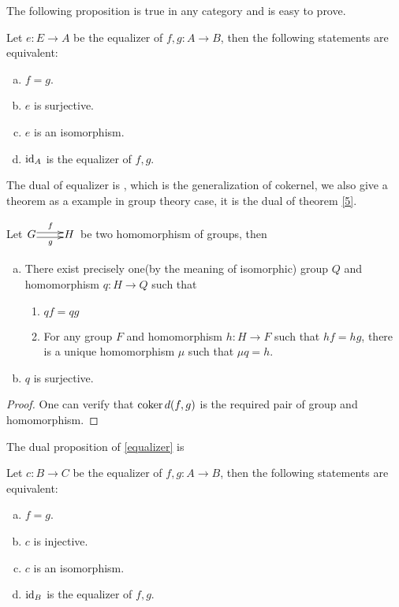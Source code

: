 The following proposition is true in any category and is easy to prove.
\begin{prop}\label{equalizer}
  Let $e\colon E\to A$ be the equalizer of $f,g\colon A\to B$, then the following statements are equivalent:
  \begin{enumerate}[a)]
    \setlength{\itemindent}{2ex}
    \item $f=g$.
    \item $e$ is surjective.
    \item $e$ is an isomorphism.
    \item $\operatorname{id}_A$ is the equalizer of $f,g$.
  \end{enumerate}
\end{prop}
The dual of equalizer is , which is the generalization of cokernel, we also give a theorem as a example in group theory case, it is the dual of theorem \ref{5}.
\begin{thm}
  Let $\xymatrix@1{G\ar@<0.5ex>[r]^{f}\ar@<-0.5ex>[r]_{g} &H}$ be two homomorphism of groups, then
  \begin{enumerate}[a)]
    \setlength{\itemindent}{2ex}
    \item There exist precisely one(by the meaning of isomorphic) group $Q$ and homomorphism $q\colon H\to Q$ such that
      \begin{enumerate}[1)]
       \setlength{\itemindent}{2ex}
       \item $qf=qg$
       \item For any group $F$ and homomorphism $h\colon H\to F$ such that $hf=hg$, there is a unique homomorphism $\mu$ such that $\mu q=h$.
      \end{enumerate}
    \item $q$ is surjective.
  \end{enumerate}
\end{thm}
\begin{proof}
One can verify that $\operatorname{coker} d(f,g)$ is the required pair of group and homomorphism.
\end{proof}
The dual proposition of \ref{equalizer} is
\begin{prop}
  Let $c\colon B\to C$ be the equalizer of $f,g\colon A\to B$, then the following statements are equivalent:
  \begin{enumerate}[a)]
    \setlength{\itemindent}{2ex}
    \item $f=g$.
    \item $c$ is injective.
    \item $c$ is an isomorphism.
    \item $\operatorname{id}_B$ is the equalizer of $f,g$.
  \end{enumerate}
\end{prop}
